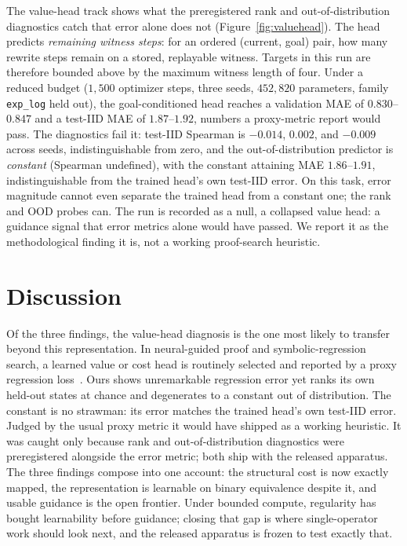 \documentclass[11pt]{article}
\begin{document}
The value-head track shows what the preregistered rank and out-of-distribution
diagnostics catch that error alone does not
(Figure~\ref{fig:valuehead}). The head predicts \emph{remaining witness
steps}: for an ordered (current, goal) pair, how many rewrite steps remain on a
stored, replayable witness. Targets in this run are therefore bounded above by
the maximum witness length of four. Under a reduced budget ($1{,}500$ optimizer
steps, three seeds, $452{,}820$ parameters, family \texttt{exp\_log} held out),
the goal-conditioned head reaches a validation MAE of $0.830$--$0.847$ and a
test-IID MAE of $1.87$--$1.92$, numbers a proxy-metric report would pass. The
diagnostics fail it: test-IID Spearman is $-0.014$, $0.002$, and $-0.009$
across seeds, indistinguishable from zero, and the out-of-distribution predictor is
\emph{constant} (Spearman undefined), with the constant attaining MAE
$1.86$--$1.91$, indistinguishable from the trained head's own test-IID error. On
this task, error magnitude cannot even separate the trained head from a constant
one; the rank and OOD probes can. The run is recorded as a null, a collapsed
value head: a guidance signal that error metrics alone would have passed. We
report it as the methodological finding it is, not a working proof-search
heuristic.

\section{Discussion}
\label{sec:discussion}
Of the three findings, the value-head diagnosis is the one most likely to
transfer beyond this representation. In
neural-guided proof and symbolic-regression search, a learned value or cost
head is routinely selected and reported by a proxy regression
loss~\cite{polu2020generative,lample2022hypertree}. Ours shows unremarkable
regression error yet ranks its own held-out states at chance and degenerates to
a constant out of distribution. The constant is no strawman: its error matches
the trained head's own test-IID error. Judged by the usual proxy
metric it would have shipped as a working heuristic. It was caught only because
rank and out-of-distribution diagnostics were preregistered alongside the error
metric; both ship with the released apparatus. The
three findings compose into one account: the structural cost is now exactly
mapped, the representation is learnable on binary equivalence
despite it, and usable guidance is the open frontier. Under bounded compute,
regularity has bought learnability before guidance; closing that gap is where
single-operator work should look next, and the released apparatus is frozen to
test exactly that.
\end{document}
